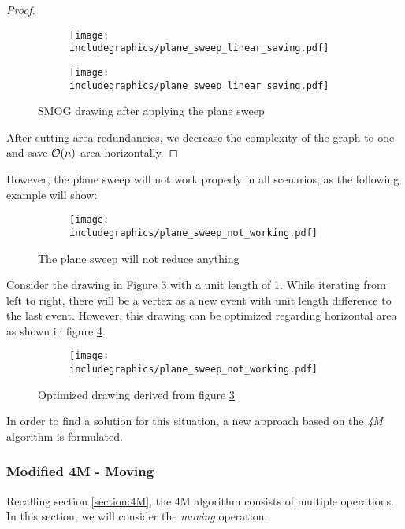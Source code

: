 \begin{proof}
	\begin{figure}[H]
	\centering
	\begin{subfigure}{0.45\linewidth}
		\centering
		\texttt{[image: includegraphics/plane\_sweep\_linear\_saving.pdf]}
		\caption{}
	\end{subfigure}	
	\begin{subfigure}{0.4\linewidth}
		\centering
		\texttt{[image: includegraphics/plane\_sweep\_linear\_saving.pdf]}
		\caption{}\label{im:ortho_max_saving5}
	\end{subfigure}
	\caption{SMOG drawing after applying the plane sweep}
\end{figure}
After cutting area redundancies, we decrease the complexity of the graph to one and save $\mathcal{O}(n)$ area horizontally.
\end{proof}
However, the plane sweep will not work properly in all scenarios, as the following example will show:
\begin{figure}[H]
	\centering
	\begin{subfigure}{0.5\linewidth}
		\centering
		\texttt{[image: includegraphics/plane\_sweep\_not\_working.pdf]}
	\end{subfigure}
	\caption{The plane sweep will not reduce anything}\label{im:plane_sweep_bad_example1}
\end{figure}
Consider the drawing in Figure \ref{im:plane_sweep_bad_example1} with a unit length of 1. While iterating from left to right, there will be a vertex as a new event with unit length difference to the last event. However, this drawing can be optimized regarding horizontal area as shown in figure \ref{im:plane_sweep_bad_example2}.
\begin{figure}[H]
	\centering
	\begin{subfigure}{0.5\linewidth}
		\centering
		\texttt{[image: includegraphics/plane\_sweep\_not\_working.pdf]}
	\end{subfigure}
	\caption{Optimized drawing derived from figure \ref{im:plane_sweep_bad_example1}}
	\label{im:plane_sweep_bad_example2}
\end{figure}
In order to find a solution for this situation, a new approach based on the \textit{4M} algorithm is formulated.
\subsubsection{Modified 4M - Moving}
Recalling section \ref{section:4M}, the 4M algorithm consists of multiple operations. In this section, we will consider the \textit{moving} operation. 
